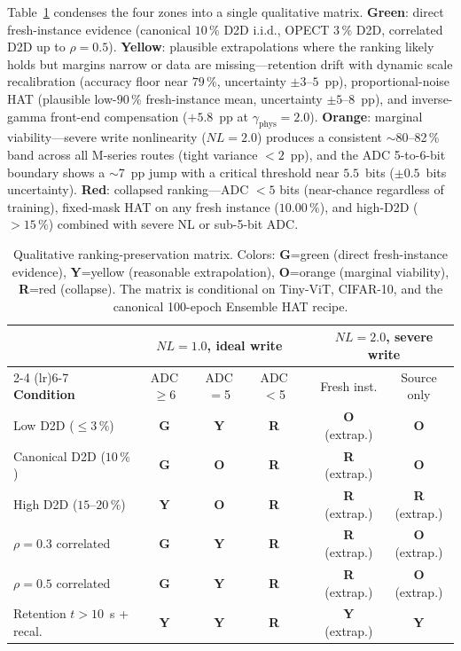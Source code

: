 Table~\ref{tab:ranking-summary} condenses the four zones into a single qualitative matrix.  \textbf{Green}: direct fresh-instance evidence (canonical $10\,\%$ D2D i.i.d., OPECT $3\,\%$ D2D, correlated D2D up to $\rho=0.5$).  \textbf{Yellow}: plausible extrapolations where the ranking likely holds but margins narrow or data are missing---retention drift with dynamic scale recalibration (accuracy floor near $79\,\%$, uncertainty $\pm 3$--$5$~pp), proportional-noise HAT (plausible low-$90\,\%$ fresh-instance mean, uncertainty $\pm 5$--$8$~pp), and inverse-gamma front-end compensation ($+5.8$~pp at $\gamma_{\mathrm{phys}}=2.0$).  \textbf{Orange}: marginal viability---severe write nonlinearity ($NL=2.0$) produces a consistent $\sim$80--82\,\% band across all M-series routes (tight variance $<2$~pp), and the ADC 5-to-6-bit boundary shows a $\sim$7~pp jump with a critical threshold near $5.5$~bits ($\pm 0.5$~bits uncertainty).  \textbf{Red}: collapsed ranking---ADC $<5$ bits (near-chance regardless of training), fixed-mask HAT on any fresh instance ($10.00\,\%$), and high-D2D ($>15\,\%$) combined with severe NL or sub-5-bit ADC.

\begin{table}[t]
    \centering
    \caption{Qualitative ranking-preservation matrix.  Colors: \textbf{G}=green (direct fresh-instance evidence), \textbf{Y}=yellow (reasonable extrapolation), \textbf{O}=orange (marginal viability), \textbf{R}=red (collapse).  The matrix is conditional on Tiny-ViT, CIFAR-10, and the canonical 100-epoch Ensemble HAT recipe.}
    \label{tab:ranking-summary}
    \small
    \setlength{\tabcolsep}{4pt}
    \begin{tabular}{@{}lcccccc@{}}
        \toprule
        & \multicolumn{3}{c}{\textbf{$NL=1.0$, ideal write}} & & \multicolumn{2}{c}{\textbf{$NL=2.0$, severe write}} \\
        \cmidrule(lr){2-4} \cmidrule(lr){6-7}
        \textbf{Condition} & ADC$\ge$6 & ADC$=$5 & ADC$<$5 & & Fresh inst. & Source only \\
        \midrule
        Low D2D ($\le 3\,\%$) & \textbf{G} & \textbf{Y} & \textbf{R} & & \textbf{O} (extrap.) & \textbf{O} \\
        Canonical D2D ($10\,\%$) & \textbf{G} & \textbf{O} & \textbf{R} & & \textbf{R} (extrap.) & \textbf{O} \\
        High D2D ($15$--$20\,\%$) & \textbf{Y} & \textbf{O} & \textbf{R} & & \textbf{R} (extrap.) & \textbf{R} (extrap.) \\
        $\rho=0.3$ correlated & \textbf{G} & \textbf{Y} & \textbf{R} & & \textbf{R} (extrap.) & \textbf{O} (extrap.) \\
        $\rho=0.5$ correlated & \textbf{G} & \textbf{Y} & \textbf{R} & & \textbf{R} (extrap.) & \textbf{O} (extrap.) \\
        Retention $t>10$~s + recal. & \textbf{Y} & \textbf{Y} & \textbf{R} & & \textbf{Y} (extrap.) & \textbf{Y} \\
        \bottomrule
    \end{tabular}
\end{table}

